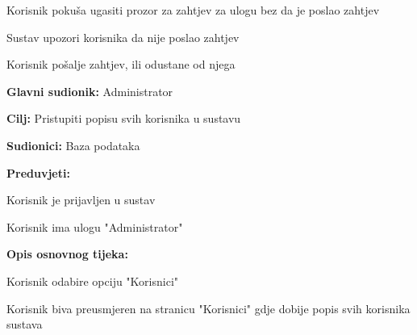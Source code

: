 \begin{packed_item}
\begin{packed_item}
\begin{packed_enum}
							\end{packed_enum}
	
							\item[3.a] Korisnik pokuša ugasiti prozor za zahtjev za ulogu bez da je poslao zahtjev
							\item[] \begin{packed_enum}
								
								\item Sustav upozori korisnika da nije poslao zahtjev
								\item Korisnik pošalje zahtjev, ili odustane od njega
								
							\end{packed_enum}
							
						\end{packed_item}
					\end{packed_item}
					
					\noindent {}
					\begin{packed_item}
	
						\item \textbf{Glavni sudionik: }Administrator
						\item  \textbf{Cilj:} Pristupiti popisu svih korisnika u sustavu
						\item  \textbf{Sudionici:} Baza podataka
						\item  \textbf{Preduvjeti:}
						\item[] \begin{packed_enum}
							\item Korisnik je prijavljen u sustav
							\item Korisnik ima ulogu "Administrator"
							\end{packed_enum}
						\item  \textbf{Opis osnovnog tijeka:}
						
						\item[] \begin{packed_enum}
	
							\item Korisnik odabire opciju "Korisnici"
							\item Korisnik biva preusmjeren na stranicu "Korisnici" gdje dobije popis svih korisnika sustava
						\end{packed_enum}
					
					\end{packed_item}
					
